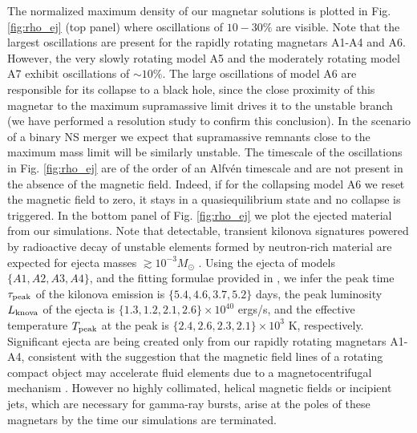 \documentclass[twocolumn,superscriptaddress,showpacs,prl,aps,amsmath,amssymb,nofootinbib]{revtex4-1}
\newcommand{\GT}{\tau}
\begin{document}
The normalized maximum density of our magnetar solutions is plotted in Fig.
\ref{fig:rho_ej} (top panel) where oscillations of $10-30\%$ are visible. Note
that the largest oscillations are present for the rapidly rotating magnetars
A1-A4 and A6. However, the very slowly rotating model A5 and the moderately
rotating model A7 exhibit oscillations of $\sim 10\%$. The large oscillations
of model A6 are responsible for its collapse to a black hole, since the close
proximity of this magnetar to the maximum supramassive limit \cite{Cook:1993qj}
drives it to the unstable branch \cite{1988ApJ...325..722F} (we have performed
a resolution study to confirm this conclusion).  In the scenario of a binary NS
merger we expect that supramassive remnants close to the maximum mass limit
will be similarly unstable. The timescale of the oscillations in Fig.
\ref{fig:rho_ej} are of the order of an Alfv\'en timescale and are not present
in the absence of the magnetic field.  Indeed, if for the collapsing model A6
we reset the magnetic field to zero, it stays in a quasiequilibrium state and
no collapse is triggered.  In the bottom panel of Fig. \ref{fig:rho_ej} we plot
the ejected material from our simulations. Note that detectable, transient
kilonova signatures powered by radioactive decay of unstable elements formed by
neutron-rich material are expected for ejecta masses $\gtrsim 10^{-3}M_\odot$
\cite{Li:1998bw, Metzger:2016pju}. Using the ejecta of models
$\{A1,A2,A3,A4\}$, and the fitting formulae provided in \cite{Perego:2021dpw},
we infer the peak time $\GT_{\rm peak}$ of the kilonova emission is
$\{5.4,4.6,3.7,5.2\}$ days, the peak luminosity $L_{\rm knova}$ of the ejecta
is $\{1.3,1.2,2.1,2.6\}\times 10^{40}$ ergs/s, and the effective temperature
$T_{\rm peak}$ at the peak is $\{2.4,2.6,2.3,2.1\}\times 10^3$ K, respectively.
Significant ejecta are being created only from our rapidly rotating magnetars
A1-A4, consistent with the suggestion that the magnetic field lines  of a
rotating compact object may accelerate fluid elements due to a
magnetocentrifugal mechanism \cite{1982MNRAS.199..883B}. However no highly
collimated, helical magnetic fields or incipient jets, which are necessary for
gamma-ray bursts,  arise at the poles of these magnetars by the time our
simulations are terminated.
\end{document}
